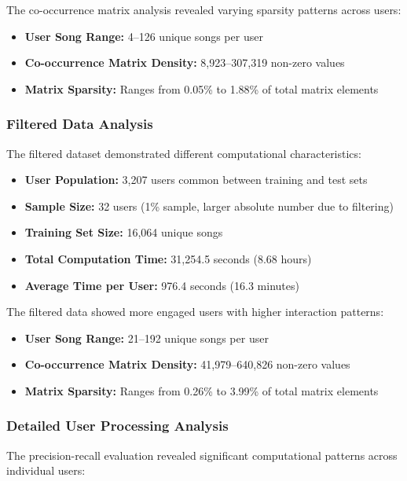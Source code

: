 \documentclass[12pt,a4paper]{article}
\begin{document}
The co-occurrence matrix analysis revealed varying sparsity patterns across users:
\begin{itemize}
    \item \textbf{User Song Range:} 4--126 unique songs per user
    \item \textbf{Co-occurrence Matrix Density:} 8,923--307,319 non-zero values
    \item \textbf{Matrix Sparsity:} Ranges from 0.05\% to 1.88\% of total matrix elements
\end{itemize}

\subsubsection{Filtered Data Analysis}

The filtered dataset demonstrated different computational characteristics:

\begin{itemize}
    \item \textbf{User Population:} 3,207 users common between training and test sets
    \item \textbf{Sample Size:} 32 users (1\% sample, larger absolute number due to filtering)
    \item \textbf{Training Set Size:} 16,064 unique songs
    \item \textbf{Total Computation Time:} 31,254.5 seconds (8.68 hours)
    \item \textbf{Average Time per User:} 976.4 seconds (16.3 minutes)
\end{itemize}

The filtered data showed more engaged users with higher interaction patterns:
\begin{itemize}
    \item \textbf{User Song Range:} 21--192 unique songs per user
    \item \textbf{Co-occurrence Matrix Density:} 41,979--640,826 non-zero values
    \item \textbf{Matrix Sparsity:} Ranges from 0.26\% to 3.99\% of total matrix elements
\end{itemize}

\subsubsection{Detailed User Processing Analysis}

The precision-recall evaluation revealed significant computational patterns across individual users:
\end{document}

